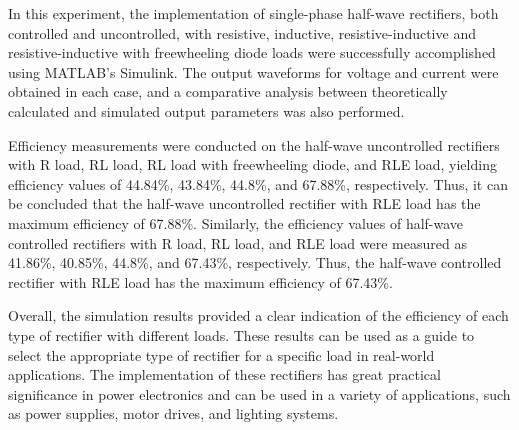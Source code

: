 In this experiment, the implementation of single-phase half-wave rectifiers, both controlled and uncontrolled, with resistive, inductive, resistive-inductive and resistive-inductive with freewheeling diode loads were successfully accomplished using MATLAB's Simulink. The output waveforms for voltage and current were obtained in each case, and a comparative analysis between theoretically calculated and simulated output parameters was also performed.

Efficiency measurements were conducted on the half-wave uncontrolled rectifiers with R load, RL load, RL load with freewheeling diode, and RLE load, yielding efficiency values of 44.84\%, 43.84\%, 44.8\%, and 67.88\%, respectively. Thus, it can be concluded that the half-wave uncontrolled rectifier with RLE load has the maximum efficiency of 67.88\%. Similarly, the efficiency values of half-wave controlled rectifiers with R load, RL load, and RLE load were measured as 41.86\%, 40.85\%, 44.8\%, and 67.43\%, respectively. Thus, the half-wave controlled rectifier with RLE load has the maximum efficiency of 67.43\%.

Overall, the simulation results provided a clear indication of the efficiency of each type of rectifier with different loads. These results can be used as a guide to select the appropriate type of rectifier for a specific load in real-world applications. The implementation of these rectifiers has great practical significance in power electronics and can be used in a variety of applications, such as power supplies, motor drives, and lighting systems.
\pagebreak
